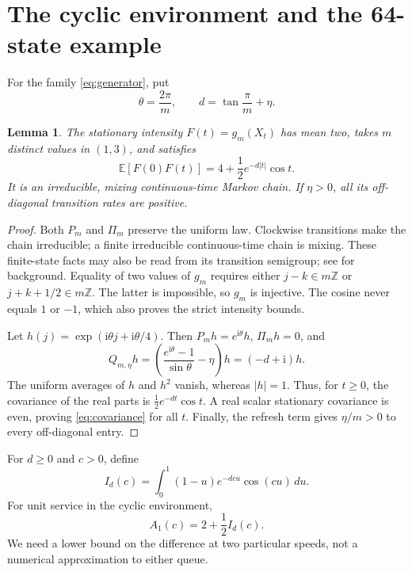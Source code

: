 \documentclass[10pt,a4paper]{amsart}
\numberwithin{equation}{section}
\newtheorem{lemma}[theorem]{Lemma}
\newcommand{\E}{\mathbb E}
\newcommand{\Z}{\mathbb Z}
\newcommand{\1}{\mathbf 1}
\newcommand{\ii}{\mathrm i}
\begin{document}
\section{The cyclic environment and the 64-state example}\label{sec:cycle}
For the family \eqref{eq:generator}, put
\begin{equation}\label{eq:delta}
 \theta=\frac{2\pi}{m},\qquad d=\tan\frac\pi m+\eta.
\end{equation}
\begin{lemma}\label{lem:cycle}
The stationary intensity $F(t)=g_m(X_t)$ has mean two, takes $m$ distinct values in $(1,3)$, and satisfies
\begin{equation}\label{eq:covariance}
 \E[F(0)F(t)]=4+\frac12e^{-d|t|}\cos t.
\end{equation}
It is an irreducible, mixing continuous-time Markov chain. If $\eta>0$, all its off-diagonal transition rates are positive.
\end{lemma}
\begin{proof}
Both $P_m$ and $\Pi_m$ preserve the uniform law. Clockwise transitions make the chain irreducible; a finite irreducible continuous-time chain is mixing. These finite-state facts may also be read from its transition semigroup; see \cite{Norris97} for background. Equality of two values of $g_m$ requires either $j-k\in m\Z$ or $j+k+1/2\in m\Z$. The latter is impossible, so $g_m$ is injective. The cosine never equals $1$ or $-1$, which also proves the strict intensity bounds.

Let $h(j)=\exp(\ii\theta j+\ii\theta/4)$. Then $P_mh=e^{\ii\theta}h$, $\Pi_mh=0$, and
\[
 Q_{m,\eta}h=\left(\frac{e^{\ii\theta}-1}{\sin\theta}-\eta\right)h=(-d+\ii)h.
\]
The uniform averages of $h$ and $h^2$ vanish, whereas $|h|=1$. Thus, for $t\ge0$, the covariance of the real parts is $\tfrac12e^{-dt}\cos t$. A real scalar stationary covariance is even, proving \eqref{eq:covariance} for all $t$. Finally, the refresh term gives $\eta/m>0$ to every off-diagonal entry.
\end{proof}
For $d\ge0$ and $c>0$, define
\begin{equation}\label{eq:Id}
 I_d(c)=\int_0^1(1-u)e^{-dcu}\cos(cu)\,du.
\end{equation}
For unit service in the cyclic environment,
\begin{equation}\label{eq:Aunit}
 A_1(c)=2+\frac12I_d(c).
\end{equation}
We need a lower bound on the difference at two particular speeds, not a numerical approximation to either queue.
\end{document}
